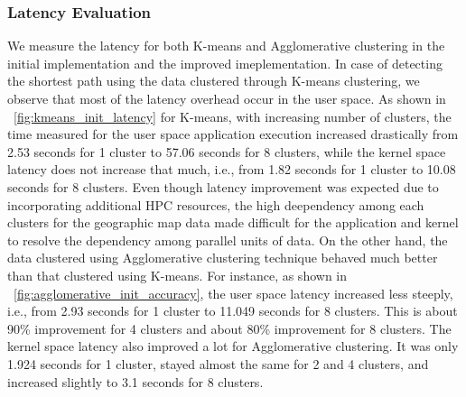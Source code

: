 \subsubsection{Latency Evaluation}
\label{sec:latency_eval}
We measure the latency for both K-means and Agglomerative clustering in the initial implementation and the improved imeplementation.
In case of detecting the shortest path using the data clustered through K-means clustering, we observe that most of the latency
overhead occur in the user space. As shown in \figurename~\ref{fig:kmeans_init_latency} for K-means, with increasing number of clusters,
the time measured for the user space application execution increased drastically from 2.53 seconds for 1 cluster to 57.06 seconds
for 8 clusters, while the kernel space latency does not increase that much, i.e., from 1.82 seconds for 1 cluster to 10.08 seconds for 8 clusters.
Even though latency improvement was expected due to incorporating additional HPC resources, the high deependency among each
clusters for the geographic map data made difficult for the application and kernel to resolve the dependency among parallel units
of data. On the other hand, the data clustered using Agglomerative clustering technique behaved much better than that clustered using K-means.
For instance, as shown in \figurename~\ref{fig:agglomerative_init_accuracy}, the user space latency increased less steeply, i.e.,
from 2.93 seconds for 1 cluster to 11.049 seconds for 8 clusters. This is about 90\% improvement for 4 clusters and about 80\% improvement for
8 clusters. The kernel space latency also improved a lot for Agglomerative clustering. It was only 1.924 seconds for 1 cluster, stayed
almost the same for 2 and 4 clusters, and increased slightly to 3.1 seconds for 8 clusters.

